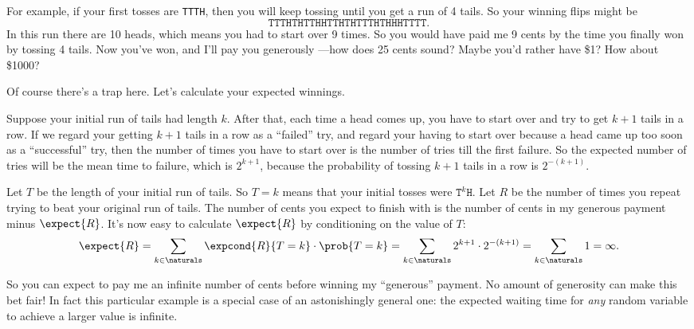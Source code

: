For example, if your first tosses are \texttt{TTTH}, then you will
keep tossing until you get a run of 4 tails.  So your winning
flips might be
\[
\texttt{TTTHTHTTHHTTHTHTTTHTHHHTTTT}.
\]
In this run there are 10 heads, which means you had to start over 9
times.  So you would have paid me 9 cents by the time you finally won
by tossing 4 tails.  Now you've won, and I'll pay you generously
---how does 25 cents sound?  Maybe you'd rather have \$1?  How about
\$1000?

Of course there's a trap here.  Let's calculate your expected
winnings.

Suppose your initial run of tails had length $k$.  After that, each
time a head comes up, you have to start over and try to get $k+1$ tails
in a row.  If we regard your getting $k+1$ tails in a row as a
``failed'' try, and regard your having to start over because a head
came up too soon as a ``successful'' try, then the number of times you
have to start over is the number of tries till the first failure.  So
the expected number of tries will be the mean time to failure, which is
$2^{k+1}$, because the probability of tossing $k+1$ tails in a row is
$2^{-(k+1)}$.

Let $T$ be the length of your initial run of tails.  So $T = k$ means
that your initial tosses were $\texttt{T}^k\texttt{H}$.  Let $R$ be
the number of times you repeat trying to beat your original run of
tails.  The number of cents you expect to finish with is the number of
cents in my generous payment minus $\expect{R}$.  It's now easy to
calculate $\expect{R}$ by conditioning on the value of $T$:
\[
\expect{R}
     = \sum_{k \in \naturals} \expcond{R}{T=k} \cdot \prob{T=k}
     = \sum_{k \in \naturals}  2^{k+1} \cdot 2^{-(k+1)}
     = \sum_{k \in \naturals} 1 = \infty.
\]

\iffalse
\begin{align*}
\expect{R}
    & = \sum_{k \in \naturals} \expcond{R}{T=k} \cdot \prob{T=k}\\
    & = \sum_{k \in \naturals}  2^{k+1} \cdot 2^{-(k+1)}\\
    & = \sum_{k \in \naturals} 1 = \infty.
\end{align*}
\fi

So you can expect to pay me an infinite number of cents before winning
my ``generous'' payment.  No amount of generosity can make this bet
fair!  In fact this particular example is a special case of an
astonishingly general one: \iffalse worked out in
Problem~\ref{PS_infinite_repeat_expectation}\fi the expected waiting
time for \emph{any} random variable to achieve a larger value is
infinite.

